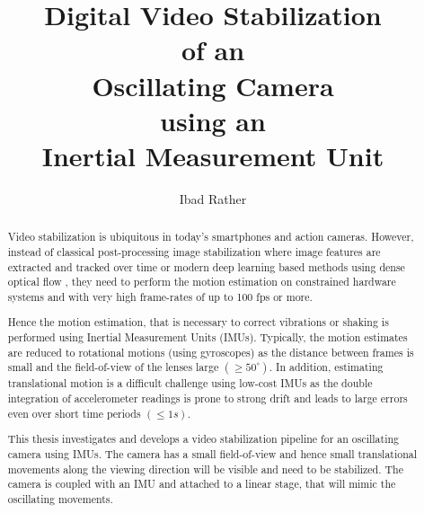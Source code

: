\documentclass[
thesis  %
]{csthes}
\title{Digital Video Stabilization \\ of an \\ Oscillating Camera \\
using an \\ Inertial Measurement Unit}
\subtitle{}%
\author{Ibad Rather \matr{1532894}}
\begin{document}
\maketitle
\begin{abstract}
Video stabilization is ubiquitous in today's smartphones and action cameras. However, instead of classical post-processing image stabilization where image features are extracted and tracked over time \citep{morimoto1998evaluation} or modern deep learning based methods using dense optical flow \citep{yu2020learning}, they need to perform the motion estimation on constrained hardware systems and with very high  frame-rates of up to 100 fps or more. 

Hence the motion estimation, that is necessary to correct vibrations or shaking is performed using Inertial Measurement Units (IMUs). Typically, the motion estimates are reduced to rotational motions \citep{karpenko2011digital} (using gyroscopes) as the distance between frames is small and the field-of-view of the lenses large $(\geq 50^\circ)$. In addition, estimating translational motion is a difficult challenge using low-cost IMUs as the double integration of accelerometer readings is prone to strong drift and leads to large errors even over short time periods $(\leq 1s)$. 

This thesis investigates and develops a video stabilization pipeline for an oscillating camera using IMUs. The camera has a small field-of-view and hence small translational movements along the viewing direction will be visible and need to be stabilized. The camera is coupled with an IMU and attached to a linear stage, that will mimic the oscillating movements.

\end{abstract}
\tableofcontents%

\listoftables%
\listoffigures%

\mainmatter







\end{document}
